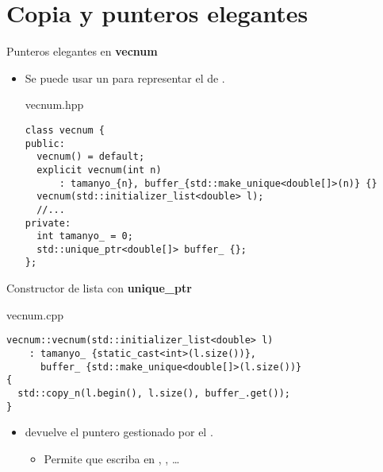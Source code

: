 \section{Copia y punteros elegantes}

\begin{frame}[t,fragile]{Punteros elegantes en \textbf{vecnum}}
\begin{itemize}
  \item Se puede usar un  para representar el 
         de .
\begin{block}{vecnum.hpp}
\begin{lstlisting}
class vecnum {
public:
  vecnum() = default;
  explicit vecnum(int n) 
      : tamanyo_{n}, buffer_{std::make_unique<double[]>(n)} {}
  vecnum(std::initializer_list<double> l);
  //...
private:
  int tamanyo_ = 0;
  std::unique_ptr<double[]> buffer_ {};
};
\end{lstlisting}
\end{block}
\end{itemize}
\end{frame}

\begin{frame}[t,fragile]{Constructor de lista con \textbf{unique\_ptr}}
\begin{block}{vecnum.cpp}
\begin{lstlisting}
vecnum::vecnum(std::initializer_list<double> l)
    : tamanyo_ {static_cast<int>(l.size())},
      buffer_ {std::make_unique<double[]>(l.size())}
{
  std::copy_n(l.begin(), l.size(), buffer_.get());
}
\end{lstlisting}
\end{block}

\begin{itemize}
  \item {} devuelve el puntero gestionado por el
        .
    \begin{itemize}
      \item Permite que  escriba en 
            , , \ldots
    \end{itemize}
\end{itemize}
\end{frame}


